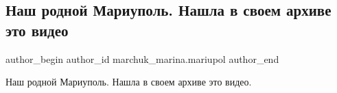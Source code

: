 
 
 
 
 

\subsection{Наш родной Мариуполь. Нашла в своем архиве это видео}
\label{sec:12_12_2022.fb.marchuk_marina.mariupol.1.nash_rodnoi_mariupol}

\ifcmt
 author_begin
   author_id marchuk_marina.mariupol
 author_end
\fi

Наш родной Мариуполь. Нашла в своем архиве это видео.

